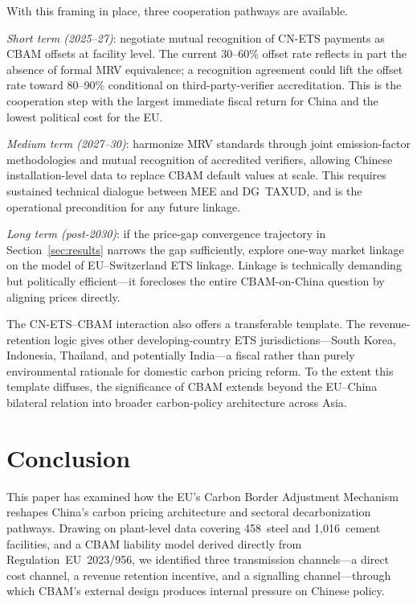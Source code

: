 \documentclass[letterpaper, 10pt, conference]{ieeeconf}
\begin{document}
With this framing in place, three cooperation pathways are available.

\emph{Short term (2025--27)}: negotiate mutual recognition of CN-ETS
payments as CBAM offsets at facility level. The current 30--60\%
offset rate \citep{Li2026} reflects in part the absence of formal
MRV equivalence; a recognition agreement could lift the offset rate
toward 80--90\% conditional on third-party-verifier accreditation.
This is the cooperation step with the largest immediate fiscal
return for China and the lowest political cost for the EU.

\emph{Medium term (2027--30)}: harmonize MRV standards through joint
emission-factor methodologies and mutual recognition of accredited
verifiers, allowing Chinese installation-level data to replace CBAM
default values at scale. This requires sustained technical dialogue
between MEE and DG~TAXUD, and is the operational precondition for
any future linkage.

\emph{Long term (post-2030)}: if the price-gap convergence trajectory
in Section~\ref{sec:results} narrows the gap sufficiently, explore
one-way market linkage on the model of EU--Switzerland ETS linkage.
Linkage is technically demanding but politically efficient---it
forecloses the entire CBAM-on-China question by aligning prices
directly.

The CN-ETS--CBAM interaction also offers a transferable template.
The revenue-retention logic gives other developing-country ETS
jurisdictions---South Korea, Indonesia, Thailand, and potentially
India---a fiscal rather than purely environmental rationale for
domestic carbon pricing reform. To the extent this template diffuses,
the significance of CBAM extends beyond the EU--China bilateral
relation into broader carbon-policy architecture across Asia.

\section{Conclusion}
\label{sec:conclusion}

This paper has examined how the EU's Carbon Border Adjustment
Mechanism reshapes China's carbon pricing architecture and sectoral
decarbonization pathways. Drawing on plant-level data covering
458~steel and 1{,}016~cement facilities, and a CBAM liability model
derived directly from Regulation~EU~2023/956, we identified three
transmission channels---a direct cost channel, a revenue retention
incentive, and a signalling channel---through which CBAM's external
design produces internal pressure on Chinese policy.
\end{document}
